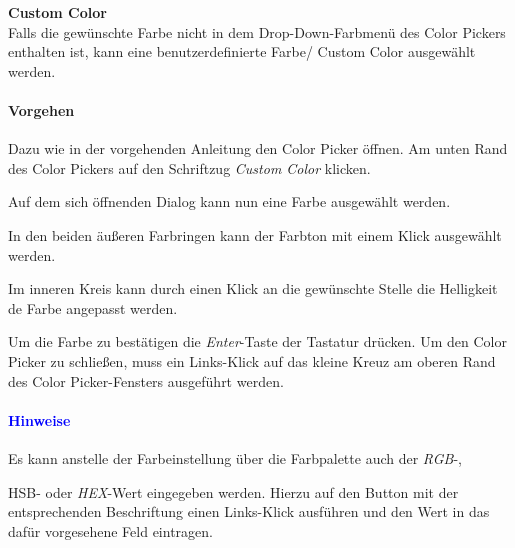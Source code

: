 \documentclass[enabledeprecatedfontcommands,fontsize=11pt,paper=a4,twoside]{scrartcl}
\newcounter{one}
\newcounter{two}[one]
\newcommand*{\hint}{\paragraph{\textcolor{blue}{Hinweise}}}
\newcommand*{\action}{\paragraph{Vorgehen}}
\let\tempone\itemize
\let\temptwo\enditemize
\renewenvironment{itemize}{\tempone\addtolength{\itemsep}{-10.0pt}}{\temptwo}
\let\origenumerate\enumerate
\let\origendenumerate\endenumerate
\renewenvironment{enumerate}{\origenumerate \addtolength{\itemsep}{-10.0pt}}{\origendenumerate}
\begin{document}
\textbf{Custom Color}\\
Falls die gewünschte Farbe nicht in dem Drop-Down-Farbmenü des Color Pickers enthalten ist, kann eine benutzerdefinierte Farbe/ Custom Color ausgewählt werden. 
\action
\begin{enumerate}
	\item Dazu wie in der vorgehenden Anleitung den Color Picker öffnen. Am unten Rand des Color Pickers auf den Schriftzug \textit{Custom Color} klicken. 
	\item Auf dem sich öffnenden Dialog kann nun eine Farbe ausgewählt werden. 
	\item In den beiden äußeren Farbringen kann der Farbton mit einem Klick ausgewählt werden.
	\item Im inneren Kreis kann durch einen Klick an die gewünschte Stelle die Helligkeit de Farbe angepasst werden.
	\item Um die Farbe zu bestätigen die \textit{Enter}-Taste der Tastatur drücken. Um den Color Picker zu schließen, muss ein Links-Klick auf das kleine Kreuz am oberen Rand des Color Picker-Fensters ausgeführt werden.
\end{enumerate} 
\hint
\begin{itemize}
	\item Es kann anstelle der Farbeinstellung über die Farbpalette auch der \textit{RGB}-, \item{HSB}- oder \textit{HEX}-Wert eingegeben werden. Hierzu auf den Button mit der entsprechenden Beschriftung einen Links-Klick ausführen und den Wert in das dafür vorgesehene Feld eintragen.
\end{itemize} 

\begin{figure}[ht!]
	\centering
\end{figure}
\end{document}
